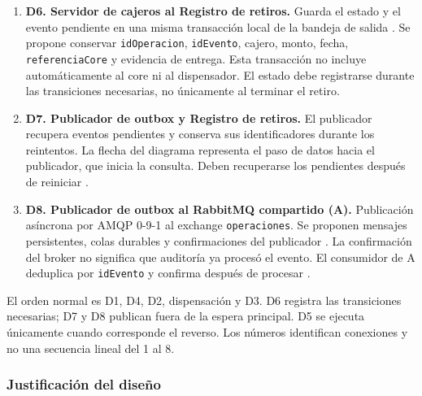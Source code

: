 \documentclass[12pt,a4paper]{article}
\begin{document}
\begin{enumerate}
    \item \textbf{D6. Servidor de cajeros al Registro de retiros.}
    Guarda el estado y el evento pendiente en una misma transacción local de la bandeja de salida \cite{awsoutbox}. Se propone conservar \texttt{idOperacion}, \texttt{idEvento}, cajero, monto, fecha, \texttt{referenciaCore} y evidencia de entrega. Esta transacción no incluye automáticamente al core ni al dispensador. El estado debe registrarse durante las transiciones necesarias, no únicamente al terminar el retiro.

    \item \textbf{D7. Publicador de outbox y Registro de retiros.}
    El publicador recupera eventos pendientes y conserva sus identificadores durante los reintentos. La flecha del diagrama representa el paso de datos hacia el publicador, que inicia la consulta. Deben recuperarse los pendientes después de reiniciar \cite{awsoutbox}.

    \item \textbf{D8. Publicador de outbox al RabbitMQ compartido (A).}
    Publicación asíncrona por AMQP 0-9-1 al exchange \texttt{operaciones}. Se proponen mensajes persistentes, colas durables y confirmaciones del publicador \cite{rabbitmqconfirms,rabbitmqreliability}. La confirmación del broker no significa que auditoría ya procesó el evento. El consumidor de A deduplica por \texttt{idEvento} y confirma después de procesar \cite{rabbitmqconfirms}.
\end{enumerate}

El orden normal es D1, D4, D2, dispensación y D3. D6 registra las transiciones necesarias; D7 y D8 publican fuera de la espera principal. D5 se ejecuta únicamente cuando corresponde el reverso. Los números identifican conexiones y no una secuencia lineal del 1 al 8.

\subsubsection{Justificación del diseño}
\end{document}
